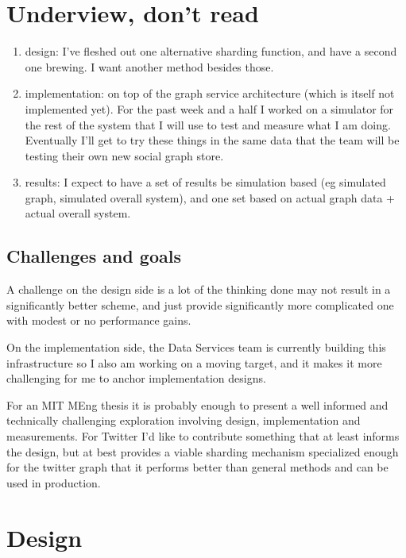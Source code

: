 \documentclass{article}
\begin{document}



\section{Underview, don't read}
\begin{enumerate}
\item design: I've fleshed out one alternative sharding function, and have a second one brewing. I want another method besides those. 

\item implementation: on top of the graph service architecture (which is itself not implemented yet). For the past week and a half I  worked on a simulator
for the rest of the system that I will use to test and measure what I am doing. Eventually I'll get to try these things in the same data that the team will be testing their own new social graph store.

\item results: I expect to have a set of results be simulation based (eg simulated graph, simulated overall system),  and one set based on actual graph data + actual overall system.
\end{enumerate}
\subsection{Challenges and goals}
A challenge on the design side is a lot of the thinking done may not result in a significantly better scheme, and just provide significantly more complicated one with modest or no performance gains. 

On the implementation side, the Data Services team is currently building this infrastructure so I also am working on a moving target, and it makes it more challenging for me to anchor implementation designs.

For an MIT MEng thesis it is probably enough to present a well informed and technically challenging exploration involving design, implementation and measurements. For Twitter I'd like to contribute something that at least informs the design, but at best provides a viable sharding mechanism specialized enough for the twitter graph that it performs better than general methods and can be used in production.

\section{Design}
\end{document}
